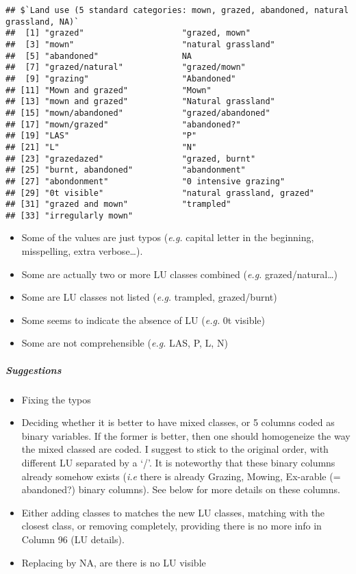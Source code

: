 \documentclass[table]{article}
\providecommand{\tightlist}{%
  \setlength{\itemsep}{0pt}\setlength{\parskip}{0pt}}
\let\oldsubparagraph\subparagraph
\renewcommand{\subparagraph}[1]{\oldsubparagraph{#1}\mbox{}}
\begin{document}
\begin{verbatim}
## $`Land use (5 standard categories: mown, grazed, abandoned, natural grassland, NA)`
##  [1] "grazed"                    "grazed, mown"             
##  [3] "mown"                      "natural grassland"        
##  [5] "abandoned"                 NA                         
##  [7] "grazed/natural"            "grazed/mown"              
##  [9] "grazing"                   "Abandoned"                
## [11] "Mown and grazed"           "Mown"                     
## [13] "mown and grazed"           "Natural grassland"        
## [15] "mown/abandoned"            "grazed/abandoned"         
## [17] "mown/grazed"               "abandoned?"               
## [19] "LAS"                       "P"                        
## [21] "L"                         "N"                        
## [23] "grazedazed"                "grazed, burnt"            
## [25] "burnt, abandoned"          "abandonment"              
## [27] "abondonment"               "0 intensive grazing"      
## [29] "0t visible"                "natural grassland, grazed"
## [31] "grazed and mown"           "trampled"                 
## [33] "irregularly mown"
\end{verbatim}

\begin{itemize}
\tightlist
\item
  Some of the values are just typos (\emph{e.g.} capital letter in the
  beginning, misspelling, extra verbose\ldots{}).
\item
  Some are actually two or more LU classes combined (\emph{e.g.}
  grazed/natural\ldots{})
\item
  Some are LU classes not listed (\emph{e.g.} trampled, grazed/burnt)
\item
  Some seems to indicate the absence of LU (\emph{e.g.} 0t visible)
\item
  Some are not comprehensible (\emph{e.g.} LAS, P, L, N)
\end{itemize}

\subparagraph{\texorpdfstring{\emph{Suggestions}}{Suggestions}}\label{suggestions}

\begin{itemize}
\tightlist
\item
  Fixing the typos
\item
  Deciding whether it is better to have mixed classes, or 5 columns
  coded as binary variables. If the former is better, then one should
  homogeneize the way the mixed classed are coded. I suggest to stick to
  the original order, with different LU separated by a `/'. It is
  noteworthy that these binary columns already somehow exists
  (\emph{i.e} there is already Grazing, Mowing, Ex-arable (= abandoned?)
  binary columns). See below for more details on these columns.
\item
  Either adding classes to matches the new LU classes, matching with the
  closest class, or removing completely, providing there is no more info
  in Column 96 (LU details).
\item
  Replacing by NA, are there is no LU visible
\end{itemize}
\end{document}
